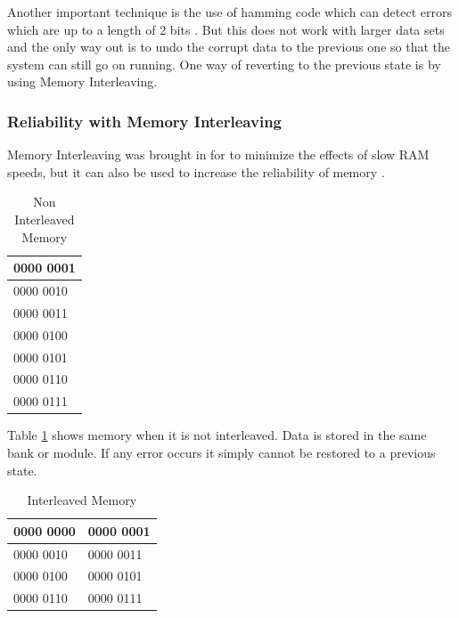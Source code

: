 \documentclass[12pt,a4paper]{article}
\begin{document}
	Another important technique is the use of hamming code which can detect errors which are up to a length of 2 bits \citep{moon2005error}. But this does not work with larger data sets and the only way out is to undo the corrupt data to the previous one so that the system can still go on running. One way of reverting to the previous state is by using Memory Interleaving\citep{burnett1970study}.	
	
\subsubsection{Reliability with Memory Interleaving}


Memory Interleaving was brought in for to minimize the effects of slow RAM speeds, but it can also be used to increase the reliability of memory \citep{burnett1970study}.\\

\begin{table}[!htb]
	\centering
	\caption{Non Interleaved Memory}
	\label{table:mylabel}
	\begin{tabular}{l}
		\hline
		\multicolumn{1}{|l|}{0000 0001}                   \\ \hline
		\multicolumn{1}{|l|}{0000 0010}                   \\ \hline
		\multicolumn{1}{|l|}{0000 0011}                   \\ \hline
		\multicolumn{1}{|l|}{0000 0100}                   \\ \hline
		\multicolumn{1}{|l|}{0000 0101}                   \\ \hline
		\multicolumn{1}{|l|}{0000 0110}                   \\ \hline
		\multicolumn{1}{|l|}{0000 0111}                   \\ \hline
                                
	\end{tabular}
\end{table}

Table \ref{table:mylabel} shows memory when it is not interleaved. Data is stored in the same bank or module. If any error occurs it simply cannot be restored to a previous state.\\

\begin{table}[!htb]
	\centering
	\caption{Interleaved Memory}
	\label{table:mylabel2}
	\begin{tabular}{|l|l|}
		\hline
		0000 0000 & 0000 0001 \\ \hline
		0000 0010 & 0000 0011        \\ \hline
		0000 0100 & 0000 0101       \\ \hline
		0000 0110 & 0000 0111       \\ \hline
	
	\end{tabular}
\end{table}
\end{document}

